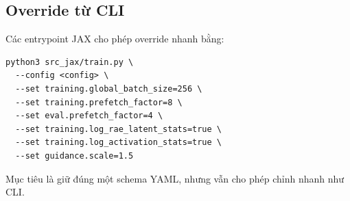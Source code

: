 \subsection{Override từ CLI}

Các entrypoint JAX cho phép override nhanh bằng:

\begin{lstlisting}[style=rae]
python3 src_jax/train.py \
  --config <config> \
  --set training.global_batch_size=256 \
  --set training.prefetch_factor=8 \
  --set eval.prefetch_factor=4 \
  --set training.log_rae_latent_stats=true \
  --set training.log_activation_stats=true \
  --set guidance.scale=1.5
\end{lstlisting}

Mục tiêu là giữ đúng một schema YAML, nhưng vẫn cho phép chỉnh nhanh như CLI.
